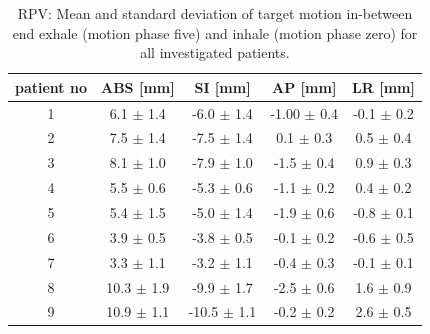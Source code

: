 \vspace*{-0.5cm}

\begin{table}[htbp]
  \centering
  \caption{RPV: Mean and standard deviation of target motion in-between end exhale (motion phase five) and inhale (motion phase zero) for all 
  investigated patients.}
  \begin{tabular}{|c|c|c|c|c|}
    \hline\hline
    patient no\rule{0pt}{2.6ex}\rule[-1.2ex]{0pt}{0pt} & ABS [mm] & SI [mm] & AP [mm] & LR [mm]\\
    \hline
    1 & 6.1 $\pm$ 1.4 & -6.0 $\pm$ 1.4 & -1.00 $\pm$ 0.4 & -0.1 $\pm$ 0.2 \\
    2 & 7.5 $\pm$ 1.4 & -7.5 $\pm$ 1.4 & 0.1 $\pm$ 0.3 & 0.5 $\pm$ 0.4 \\
    3 & 8.1 $\pm$ 1.0 & -7.9 $\pm$ 1.0 & -1.5 $\pm$ 0.4 & 0.9 $\pm$ 0.3 \\
    4 & 5.5 $\pm$ 0.6 & -5.3 $\pm$ 0.6 & -1.1 $\pm$ 0.2 & 0.4 $\pm$ 0.2 \\
    5 & 5.4 $\pm$ 1.5 & -5.0 $\pm$ 1.4 & -1.9 $\pm$ 0.6 & -0.8 $\pm$ 0.1 \\
    6 & 3.9 $\pm$ 0.5 & -3.8 $\pm$ 0.5 & -0.1 $\pm$ 0.2 & -0.6 $\pm$ 0.5 \\
    7 & 3.3 $\pm$ 1.1 & -3.2 $\pm$ 1.1 & -0.4 $\pm$ 0.3 & -0.1 $\pm$ 0.1 \\
    8 & 10.3 $\pm$ 1.9 & -9.9 $\pm$ 1.7 & -2.5 $\pm$ 0.6 & 1.6 $\pm$ 0.9 \\
    9 & 10.9 $\pm$ 1.1 & -10.5 $\pm$ 1.1 & -0.2 $\pm$ 0.2 & 2.6 $\pm$ 0.5 \\
    \hline\hline
  \end{tabular}
  \label{tab:motion:RPV:mdacc}
\end{table}

\vspace*{-0.5cm}

